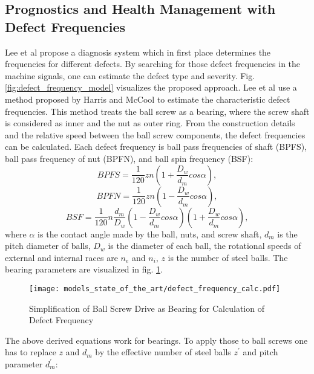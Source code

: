 \subsection{Prognostics and Health Management with Defect Frequencies}
Lee et al \cite{Lee2015} propose a diagnosis system which in first place determines the frequencies for different defects. By searching for those defect frequencies in the machine signals, one can estimate the defect type and severity. Fig. \ref{fig:defect_frequency_model} visualizes the proposed approach. Lee et al use a method proposed by Harris and McCool \cite{Harris1996} to estimate the characteristic defect frequencies. This method treats the ball screw as a bearing, where the screw shaft is considered as inner and the nut as outer ring. From the construction details and the relative speed between the ball screw components, the defect frequencies can be calculated. Each defect frequency is ball pass frequencies of shaft (BPFS), ball pass frequency of nut (BPFN), and ball spin frequency (BSF): 
\begin{equation}
    BPFS = \frac{1}{120}zn(1+\frac{D_{w}}{d_{m}}cos\alpha),
    \label{eq:defect_frequency}
\end{equation}
\begin{equation}
    BPFN = \frac{1}{120}zn(1-\frac{D_{w}}{d_{m}}cos\alpha),
\end{equation}
\begin{equation}
    BSF = \frac{1}{120}n\frac{d_{m}}{D_{w}} (1-\frac{D_{w}}{d_{m}}cos\alpha)(1+\frac{D_{w}}{d_{m}}cos\alpha) ,
\end{equation}
where $\alpha$ is the contact angle made by the ball, nuts, and screw shaft, $d_{m}$ is the pitch diameter of balls, $D_{w}$ is the diameter of each ball, the rotational speeds of external and internal races are $n_{e}$ and $n_{i}$, $z$ is the number of steel balls. The bearing parameters are visualized in fig. \ref{fig:defect_frequency_calc}. 

\begin{figure}[H]
  \centering
  \texttt{[image: models\_state\_of\_the\_art/defect\_frequency\_calc.pdf]}
  \caption{Simplification of Ball Screw Drive as Bearing for Calculation of Defect Frequency \cite{Lee2015}}
  \label{fig:defect_frequency_calc}
\end{figure}

The above derived equations work for bearings. To apply those to ball screws one has to replace $z$ and $d_{m}$ by the effective number of steel balls $z^{'}$ and pitch parameter $d_{m}^{'}$:


